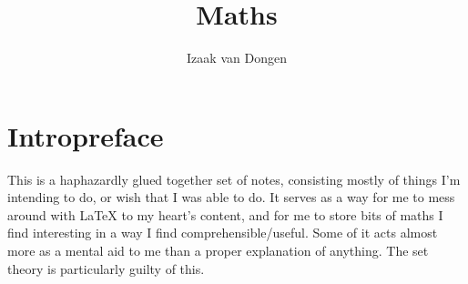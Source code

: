 \documentclass[fleqn,a4paper,11pt]{article}
\title{Maths}
\author{Izaak van Dongen}
\begin{document}
 \maketitle\thispagestyle{empty} %
 \tableofcontents
 \listoftables
 \listoffigures
 \listoflistings
 \listoftheorems

 \section{Intropreface}

 This is a haphazardly glued together set of notes, consisting mostly of things
 I'm intending to do, or wish that I was able to do. It serves as a way for me
 to mess around with \LaTeX{} to my heart's content, and for me to store bits of
 maths I find interesting in a way I find comprehensible/useful. Some of it acts
 almost more as a mental aid to me than a proper explanation of anything. The
 set theory is particularly guilty of this.

 
 
 
 
 
 
 
 
 
 
 
 
 
 
 
 
 
\nocite{*}



\end{document}
